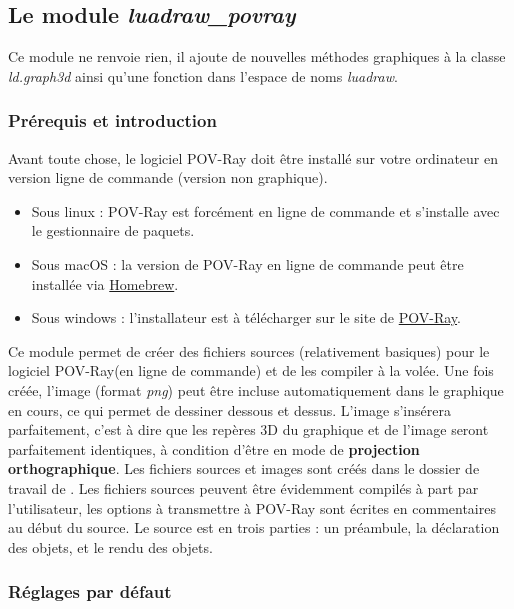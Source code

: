 \subsection{Le module \emph{luadraw\_povray}}

\newcommand*{\povray}{POV-Ray\xspace}%

Ce module ne renvoie rien, il ajoute de nouvelles méthodes graphiques à la classe \emph{ld.graph3d} ainsi qu'une fonction dans l'espace de noms \emph{luadraw}.

\subsubsection{Prérequis et introduction}
Avant toute chose, le logiciel \povray doit être installé sur votre ordinateur en version ligne de commande (version non graphique).
\begin{itemize}
    \item Sous linux : \povray est forcément en ligne de commande et s'installe avec le gestionnaire de paquets.
    \item Sous macOS : la version de \povray en ligne de commande peut être installée via \href{https://formulae.brew.sh/formula/povray\#default)}{Homebrew}.
    \item Sous windows : l'installateur est à télécharger sur le site de \href{https://www.povray.org/download/}{\povray}.
\end{itemize}


Ce module permet de créer des fichiers sources (relativement basiques) pour le logiciel \povray (en ligne de commande) et de les compiler à la volée. Une fois créée, l'image (format \emph{png}) peut être incluse automatiquement dans le graphique en cours, ce qui permet de dessiner dessous et dessus. L'image s'insérera parfaitement, c'est à dire que les repères 3D du graphique et de l'image seront parfaitement identiques, à condition d'être en mode de \textbf{projection orthographique}. Les fichiers sources et images sont créés dans le dossier de travail de \luadrawenv. Les fichiers sources peuvent être évidemment compilés à part par l'utilisateur, les options à transmettre à \povray sont écrites en commentaires au début du source. Le source est en trois parties : un préambule, la déclaration des objets, et le rendu des objets.

\subsubsection{Réglages par défaut}

